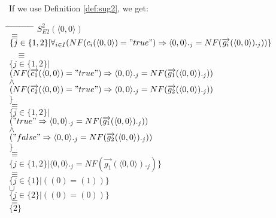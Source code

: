 \index{}\documentclass[a4paper,10pt]{article}
\theoremstyle{plain}
\theoremstyle{definition}
\newcommand{\ovr}{\overrightarrow}
\begin{document}
\begin{defn}
\begin{example}
\begin{verbatim}
\end{verbatim}
\end{example}
If we use Definition \ref{def:sug2}, we get:
\begin{tabbing}
\hspace*{5.mm} \= \hspace*{5.mm} \= \hspace*{5.mm} \= \hspace*{5.mm} \= \hspace*{5.mm} \= \hspace*{5.mm}  \= \hspace*{5.mm}  \= \hspace*{5.mm}  \= \hspace*{5.mm} \= \hspace*{5.mm} \= \hspace*{5.mm}\kill
\> \> $S_{E2}^2(\langle 0, 0 \rangle)$\\
\> $\equiv$\\
\> \> $\lbrace j \in \lbrace 1, 2 \rbrace \vert \forall_{i\in I} (NF(c_i( \langle  0,  0\rangle ) = "true") \Rightarrow  \langle  0,  0\rangle._j = NF(\ovr{g_i}( \langle  0,  0\rangle)._j))\rbrace $\\\
\> $\equiv$ \\
\> \>$\lbrace j \in \lbrace 1, 2 \rbrace \vert $ \\
\> \> \> $(NF(\ovr{c_1}( \langle  0,  0\rangle ) = "true") \Rightarrow  \langle  0,  0\rangle._j = NF(\ovr{g_{1}}( \langle  0,  0\rangle)._j)) $\\
\> \> \> $\wedge$ \\
\> \> \> $ (NF(\ovr{c_2}( \langle  0,  0\rangle ) = "true") \Rightarrow  \langle  0,  0\rangle._j = NF(\ovr{g_{2}}( \langle  0,  0\rangle)._j)) $ \\
\> \>$
\rbrace $\\
\> $\equiv$ \\
\> \> $\lbrace j \in \lbrace 1, 2 \rbrace \vert $\\
\> \> \> $("true" \Rightarrow  \langle  0,  0\rangle._j = NF(\ovr{g_{1}}( \langle  0,  0\rangle)._j))$ \\
\> \> \> $\wedge$ \\
\> \> \> $("false" \Rightarrow  \langle  0,  0\rangle._j = NF(\ovr{g_{2}}( \langle  0,  0\rangle)._j))$ \\
\> \> $\rbrace $\\
\> $\equiv$ \\
\> \> $\lbrace j \in \lbrace 1, 2 \rbrace \vert 
\langle  0,  0\rangle._j = NF(\ovr{g_1}( \langle  0,  0\rangle)._j)
\rbrace $\\
\> $\equiv$\\
\> \> $\lbrace j \in \lbrace 1 \rbrace \vert (( 0)  = ( 1)) \rbrace $\\
\> \> $\cup$ \\
\> \> $\lbrace j \in \lbrace 2 \rbrace \vert (( 0)  = ( 0)) \rbrace $\\
\> $\equiv $ \\
\> \> $\lbrace 2 \rbrace$ \\
\end{tabbing}


\end{defn}
\end{document}

